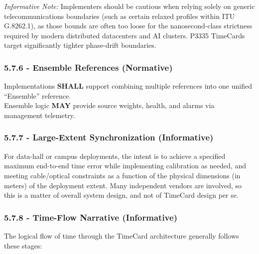 \documentclass[
]{article}
\begin{document}
\emph{Informative Note:} Implementers should be cautious when relying
solely on generic telecommunications boundaries (such as certain relaxed
profiles within ITU G.8262.1), as those bounds are often too loose for
the nanosecond-class strictness required by modern distributed
datacenters and AI clusters. P3335 TimeCards target significantly
tighter phase-drift boundaries.

\subsubsection{5.7.6 - Ensemble References
(Normative)}\label{ensemble-references-normative}

Implementations \textbf{SHALL} support combining multiple references
into one unified ``Ensemble'' reference.\\
Ensemble logic \textbf{MAY} provide source weights, health, and alarms
via management telemetry.

\subsubsection{5.7.7 - Large-Extent Synchronization
(Informative)}\label{large-extent-synchronization-informative}

For data-hall or campus deployments, the intent is to achieve a
specified maximum end-to-end time error while implementing calibration
as needed, and meeting cable/optical constraints as a function of the
physical dimensions (in meters) of the deployment extent. Many
independent vendors are involved, so this is a matter of overall system
design, and not of TimeCard design per se.

\subsubsection{5.7.8 - Time-Flow Narrative
(Informative)}\label{time-flow-narrative-informative}

The logical flow of time through the TimeCard architecture generally
follows these stages:
\end{document}
